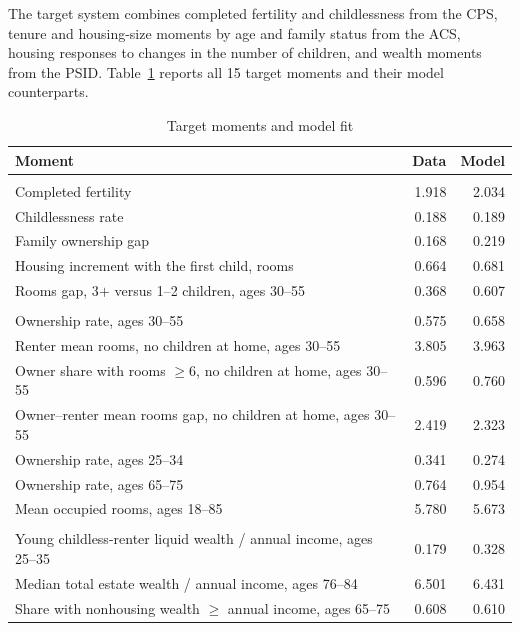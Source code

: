 \documentclass[11pt]{article}
\theoremstyle{definition}
\newcommand{\1}{\mathbf 1}
\begin{document}
The target system combines completed fertility and childlessness from the CPS,
tenure and housing-size moments by age and family status from the ACS,
housing responses to changes in the number of children, and wealth moments
from the PSID. Table~\ref{tab:quant_fit} reports all 15 target moments and their
model counterparts.

\begin{table}[H]
\centering
\caption{Target moments and model fit}
\label{tab:quant_fit}
\small
\begin{tabularx}{0.94\textwidth}{@{}>{\raggedright\arraybackslash}X r r@{}}
\toprule
Moment & Data & Model \\
\midrule
\multicolumn{3}{@{}l}{\emph{Family size and family housing}} \\
Completed fertility & 1.918 & 2.034 \\
Childlessness rate & 0.188 & 0.189 \\
Family ownership gap & 0.168 & 0.219 \\
Housing increment with the first child, rooms & 0.664 & 0.681 \\
Rooms gap, 3$+$ versus 1--2 children, ages 30--55 & 0.368 & 0.607 \\
\addlinespace
\multicolumn{3}{@{}l}{\emph{Tenure and housing consumption}} \\
Ownership rate, ages 30--55 & 0.575 & 0.658 \\
Renter mean rooms, no children at home, ages 30--55 & 3.805 & 3.963 \\
Owner share with rooms $\ge6$, no children at home, ages 30--55 & 0.596 & 0.760 \\
Owner--renter mean rooms gap, no children at home, ages 30--55 & 2.419 & 2.323 \\
Ownership rate, ages 25--34 & 0.341 & 0.274 \\
Ownership rate, ages 65--75 & 0.764 & 0.954 \\
Mean occupied rooms, ages 18--85 & 5.780 & 5.673 \\
\addlinespace
\multicolumn{3}{@{}l}{\emph{Wealth and bequests}} \\
Young childless-renter liquid wealth / annual income, ages 25--35 & 0.179 & 0.328 \\
Median total estate wealth / annual income, ages 76--84 & 6.501 & 6.431 \\
Share with nonhousing wealth $\ge$ annual income, ages 65--75 & 0.608 & 0.610 \\
\bottomrule
\end{tabularx}
\end{table}
\end{document}
